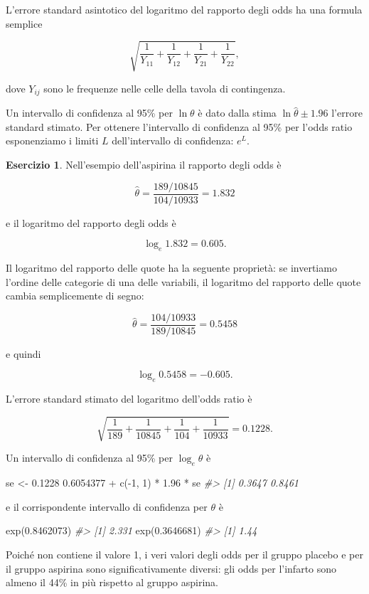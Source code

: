 \documentclass[
  11pt,
]{krantz}
\makeatletter
\newenvironment{Shaded}{\begin{snugshade}}{\end{snugshade}}
\newcommand{\CommentTok}[1]{\textcolor[rgb]{0.37,0.37,0.37}{\textit{#1}}}
\newcommand{\DecValTok}[1]{\textcolor[rgb]{0.06,0.06,0.06}{#1}}
\newcommand{\FloatTok}[1]{\textcolor[rgb]{0.06,0.06,0.06}{#1}}
\newcommand{\FunctionTok}[1]{\textcolor[rgb]{0,0,0}{#1}}
\newcommand{\NormalTok}[1]{#1}
\newcommand{\OtherTok}[1]{\textcolor[rgb]{0.37,0.37,0.37}{#1}}
\newcommand{\SpecialCharTok}[1]{\textcolor[rgb]{0,0,0}{#1}}
\newenvironment{kframe}{%
\medskip{}
\setlength{\fboxsep}{.8em}
 \def\at@end@of@kframe{}%
 \ifinner\ifhmode%
  \def\at@end@of@kframe{\end{minipage}}%
  \begin{minipage}{\columnwidth}%
 \fi\fi%
 \def\FrameCommand##1{\hskip\@totalleftmargin \hskip-\fboxsep
 \colorbox{shadecolor}{##1}\hskip-\fboxsep
     \hskip-\linewidth \hskip-\@totalleftmargin \hskip\columnwidth}%
 \MakeFramed {\advance\hsize-\width
   \@totalleftmargin\z@ \linewidth\hsize
   \@setminipage}}%
 {\par\unskip\endMakeFramed%
 \at@end@of@kframe}
\renewenvironment{Shaded}{\begin{kframe}}{\end{kframe}}
\theoremstyle{definition}
\theoremstyle{definition}
\theoremstyle{definition}
\newtheorem{exercise}{Esercizio}[chapter]
\theoremstyle{definition}
\theoremstyle{remark}
\makeatother
\begin{document}
L'errore standard asintotico del logaritmo del rapporto degli odds ha una formula semplice

\[
\sqrt{\frac{1}{Y_{11}} + \frac{1}{Y_{12}} + \frac{1}{Y_{21}} +
\frac{1}{Y_{22}}},
\]

dove \(Y_{ij}\) sono le frequenze nelle celle della tavola di contingenza.

Un intervallo di confidenza al 95\% per \(\ln \theta\) è dato dalla stima \(\ln \hat{\theta} \pm 1.96\) l'errore standard stimato. Per ottenere l'intervallo di confidenza al 95\% per l'odds ratio esponenziamo i limiti \(L\) dell'intervallo di confidenza: \(e^L\).

\begin{exercise}
Nell'esempio dell'aspirina il rapporto degli odds è

\[
\hat{\theta} = \frac{189/10845}{104/10933}= 1.832
\]

e il logaritmo del rapporto degli odds è

\[
\log_e 1.832 = 0.605.
\]

Il logaritmo del rapporto delle quote ha la seguente proprietà: se invertiamo l'ordine delle categorie di una delle variabili, il logaritmo del rapporto delle quote cambia semplicemente di segno:

\[
\hat{\theta} = \frac{104/10933}{189/10845}= 0.5458
\]

e quindi

\[
\log_e 0.5458 = -0.605.
\]

L'errore standard stimato del logaritmo dell'odds ratio è

\[
\sqrt{\frac{1}{189} + \frac{1}{10845} + \frac{1}{104} + \frac{1}{10933}} = 0.1228.
\]

Un intervallo di confidenza al 95\% per \(\log_e \theta\) è

\begin{Shaded}
\begin{Highlighting}[]
\NormalTok{se }\OtherTok{\textless{}{-}} \FloatTok{0.1228}
\FloatTok{0.6054377} \SpecialCharTok{+} \FunctionTok{c}\NormalTok{(}\SpecialCharTok{{-}}\DecValTok{1}\NormalTok{, }\DecValTok{1}\NormalTok{) }\SpecialCharTok{*} \FloatTok{1.96} \SpecialCharTok{*}\NormalTok{ se}
\CommentTok{\#\textgreater{} [1] 0.3647 0.8461}
\end{Highlighting}
\end{Shaded}

e il corrispondente intervallo di confidenza per \(\theta\) è

\begin{Shaded}
\begin{Highlighting}[]
\FunctionTok{exp}\NormalTok{(}\FloatTok{0.8462073}\NormalTok{)}
\CommentTok{\#\textgreater{} [1] 2.331}
\FunctionTok{exp}\NormalTok{(}\FloatTok{0.3646681}\NormalTok{)}
\CommentTok{\#\textgreater{} [1] 1.44}
\end{Highlighting}
\end{Shaded}

Poiché non contiene il valore 1, i veri valori degli odds per il gruppo placebo e per il gruppo aspirina sono significativamente diversi: gli odds per l'infarto sono almeno il 44\% in più rispetto al gruppo aspirina.
\end{exercise}
\end{document}
